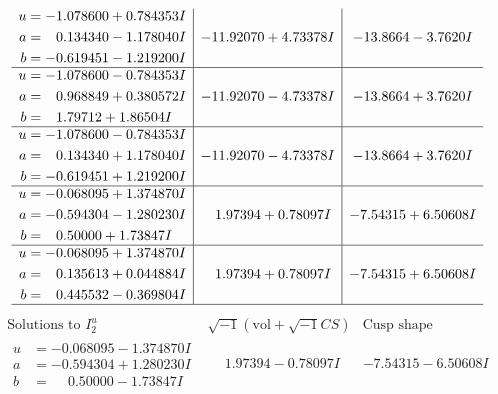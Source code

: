 \documentclass[1p]{elsarticle_modified}
\theoremstyle{definition}
\newcommand{\I}{\sqrt{-1}}
\begin{document}
$$\begin{array}{c|c|c}
\begin{aligned}
u &= -1.078600 + 0.784353 I \\
a &= \phantom{-}0.134340 - 1.178040 I \\
b &= -0.619451 - 1.219200 I\end{aligned}
 & -11.92070 + 4.73378 I & -13.8664 - 3.7620 I \\ \hline\begin{aligned}
u &= -1.078600 - 0.784353 I \\
a &= \phantom{-}0.968849 + 0.380572 I \\
b &= \phantom{-}1.79712 + 1.86504 I\end{aligned}
 & -11.92070 - 4.73378 I & -13.8664 + 3.7620 I \\ \hline\begin{aligned}
u &= -1.078600 - 0.784353 I \\
a &= \phantom{-}0.134340 + 1.178040 I \\
b &= -0.619451 + 1.219200 I\end{aligned}
 & -11.92070 - 4.73378 I & -13.8664 + 3.7620 I \\ \hline\begin{aligned}
u &= -0.068095 + 1.374870 I \\
a &= -0.594304 - 1.280230 I \\
b &= \phantom{-}0.50000 + 1.73847 I\end{aligned}
 & \phantom{-}1.97394 + 0.78097 I & -7.54315 + 6.50608 I \\ \hline\begin{aligned}
u &= -0.068095 + 1.374870 I \\
a &= \phantom{-}0.135613 + 0.044884 I \\
b &= \phantom{-}0.445532 - 0.369804 I\end{aligned}
 & \phantom{-}1.97394 + 0.78097 I & -7.54315 + 6.50608 I\\
 \hline 
 \end{array}$$\newpage$$\begin{array}{c|c|c}  
\text{Solutions to }I^u_{2}& \I (\text{vol} + \sqrt{-1}CS) & \text{Cusp shape}\\
 \hline 
\begin{aligned}
u &= -0.068095 - 1.374870 I \\
a &= -0.594304 + 1.280230 I \\
b &= \phantom{-}0.50000 - 1.73847 I\end{aligned}
 & \phantom{-}1.97394 - 0.78097 I & -7.54315 - 6.50608 I \\ \hline\begin{aligned}

\end{aligned}
\end{array}$$
\end{document}
